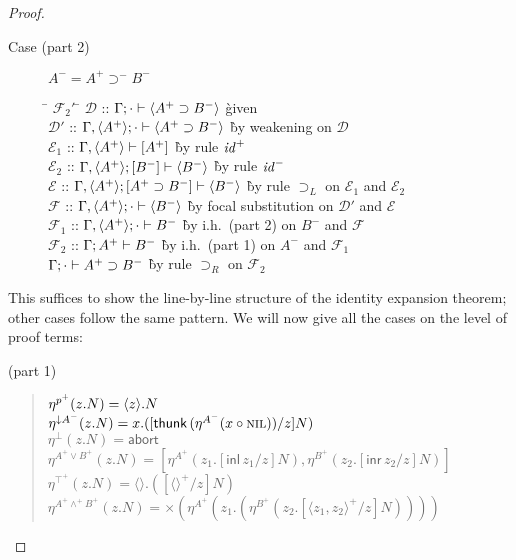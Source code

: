 \documentclass[acmtocl]{robtrans}\pdfoutput=1
\newcommand{\susp}[1]{\langle{#1}\rangle}
\newcommand{\rfoc}[2]{{#1} \vdash [{#2}] \mathstrut}
\newcommand{\lfoc}[3]{{#1}; [{#2}] \vdash {#3} \mathstrut}
\newcommand{\ifoc}[3]{{#1}; {#2} \vdash {#3} \mathstrut}
\newcommand{\dsrt}[1]{\mathsf{thunk}\,{#1}}
\newcommand{\dslt}[2]{{#1}.{#2}}      \newcommand{\usrt}[1]{\{{#1}\}}       \newcommand{\uslt}[1]{\mathsf{pm}\,{#1}}
\begin{document}
\begin{proof}
\begin{description}
\item[Case (part 2)] $A^- = A^+ \supset^- B^-$
\begin{tabbing}
\qquad \= $\mathcal F_2'$ \= \kill
\>
$\mathcal D$ \> :: $\ifoc{\Gamma}{\cdot}{\susp{A^+ \supset B^-}}$
  \` given \\
\>
$\mathcal D'$ \> :: $\ifoc{\Gamma, \susp{A^+}}{\cdot}{\susp{A^+ \supset B^-}}$
  \` by weakening on $\mathcal D$\\
\>
$\mathcal E_1$ \> :: $\rfoc{\Gamma, \susp{A^+}}{A^+}$
  \` by rule ${\it id}^+$\\
\>
$\mathcal E_2$ \> :: $\lfoc{\Gamma, \susp{A^+}}{B^-}{\susp{B^-}}$
  \` by rule ${\it id}^-$\\
\>
$\mathcal E$ \> :: $\lfoc{\Gamma,  \susp{A^+}}{A^+ \supset B^-}{\susp{B^-}}$
  \` by rule $\supset_L$ on $\mathcal E_1$ and $\mathcal E_2$\\
\>
$\mathcal F$ \> :: $\ifoc{\Gamma, \susp{A^+}}{\cdot}{\susp{B^-}}$
  \` by focal substitution on $\mathcal D'$ and $\mathcal E$\\
\>
$\mathcal F_1$ \> :: $\ifoc{\Gamma, \susp{A^+}}{\cdot}{{B^-}}$
  \` by i.h.~(part 2) on $B^-$ and $\mathcal F$\\
\>
$\mathcal F_2$ \> :: $\ifoc{\Gamma}{A^+}{{B^-}}$
  \` by i.h.~(part 1) on $A^-$ and $\mathcal F_1$\\
\>
$\ifoc{\Gamma}{\cdot}{A^+ \supset B^-}$
  \` by rule $\supset_R$ on $\mathcal F_2$
\end{tabbing}
\end{description}
This suffices to show the line-by-line structure of the identity
expansion theorem; other cases follow the same pattern. We will now
give all the cases on the level of proof terms:

\bigskip
{} (part 1) 
\begin{quote}
$\eta^{p^+}(z.N) = \etalt{z}{N}$\\
$\eta^{{\downarrow}A^-}(z.N) 
  = \dslt{x}{([\dsrt{(\eta^{A^-}(\lft{x}{\textsc{nil}}))}/z]N)}$\\
$\eta^\bot(z.N) = \mathsf{abort}$\\
$\eta^{A^+ \vee B^+}(z.N) 
  = [\eta^{A^+}(z_1.[\mathsf{inl}\,z_1/z]N), 
     \eta^{B^+}(z_2.[\mathsf{inr}\,z_2/z]N)]$\\
$\eta^{\top^+}(z.N) = \langle\rangle.([\langle\rangle^+/z]N)$\\
$\eta^{A^+ \wedge^+ B^+}(z.N) 
  = {\times}(\eta^{A^+}(z_1.
            (\eta^{B^+}(z_2. [\langle z_1, z_2 \rangle^+/z]N))))$
\end{quote}


\end{proof}
\end{document}
